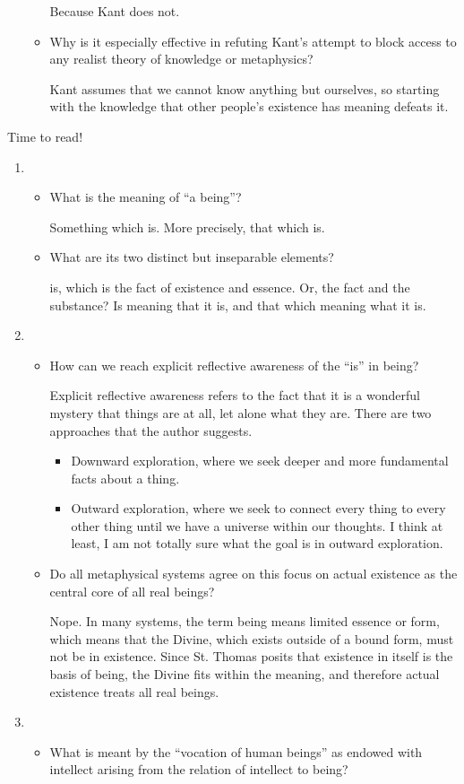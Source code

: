 \documentclass[12pt]{article}[titlepage]
\newcommand{\say}[1]{``#1''}
\newcommand{\1}{\={a}}
\newcommand{\2}{\={e}}
\newcommand{\3}{\={\i}}
\newcommand{\4}{\=o}
\newcommand{\5}{\=u}
\newcommand{\6}{\={A}}
\renewcommand{\,}{\textsuperscript{,}}
\begin{document}
\begin{enumerate}
\begin{itemize}
Because Kant does not.
\item Why is it especially effective in refuting Kant's attempt to block access to any realist theory of knowledge or metaphysics?

Kant assumes that we cannot know anything but ourselves, so starting with the knowledge that other people's existence has meaning defeats it.
\end{itemize}
\end{enumerate}

Time to read!
\begin{enumerate}
\item \begin{itemize}
\item What is the meaning of \say{a being}?

Something which is.
More precisely, that which is.
\item What are its two distinct but inseparable elements?

is, which is the fact of existence and essence.
Or, the fact and the substance?
Is meaning that it is, and that which meaning what it is.
\end{itemize}
\item \begin{itemize}
\item How can we reach explicit reflective awareness of the \say{is} in being?

Explicit reflective awareness refers to the fact that it is a wonderful mystery that things are at all, let alone what they are.
There are two approaches that the author suggests.
\begin{itemize}
\item Downward exploration, where we seek deeper and more fundamental facts about a thing.
\item Outward exploration, where we seek to connect every thing to every other thing until we have a universe within our thoughts.
I think at least, I am not totally sure what the goal is in outward exploration.
\end{itemize}
\item Do all metaphysical systems agree on this focus on actual existence as the central core of all real beings?

Nope.
In many systems, the term being means limited essence or form, which means that the Divine, which exists outside of a bound form, must not be in existence.
Since St. Thomas posits that existence in itself is the basis of being, the Divine fits within the meaning, and therefore actual existence treats all real beings.
\end{itemize}
\item \begin{itemize}
\item What  is  meant  by  the  \say{vocation  of  human  beings}  as  endowed  with intellect arising from the relation of intellect to being? 


\end{itemize}
\end{enumerate}
\end{document}
